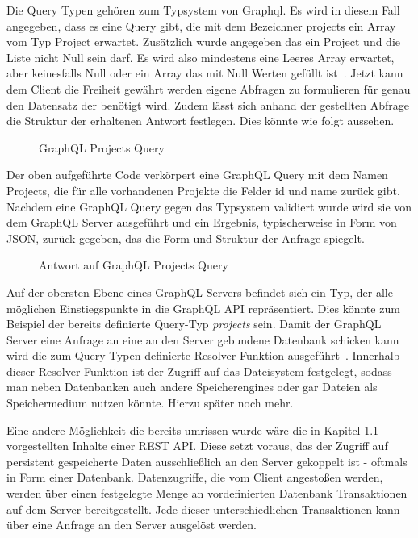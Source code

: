 Die Query Typen gehören zum Typsystem von Graphql. Es wird in diesem Fall angegeben, dass es eine Query gibt, die mit dem Bezeichner projects
ein Array vom Typ Project erwartet. Zusätzlich wurde angegeben das ein Project und die Liste nicht Null sein darf.
Es wird also mindestens eine Leeres Array erwartet, aber keinesfalls Null oder ein Array das mit Null Werten gefüllt ist~\cite{graphql}.
Jetzt kann dem Client die Freiheit gewährt werden eigene Abfragen zu formulieren für genau den Datensatz der benötigt wird.
Zudem lässt sich anhand der gestellten Abfrage die Struktur der erhaltenen Antwort festlegen. Dies könnte wie folgt aussehen.

\begin{figure}[h]
    
    \caption{GraphQL Projects Query}
    \label{fig:basics:graphql:4}
\end{figure}

Der oben aufgeführte Code verkörpert eine GraphQL Query mit dem Namen Projects, die für alle vorhandenen Projekte die Felder id und name
zurück gibt. Nachdem eine GraphQL Query gegen das Typsystem validiert wurde wird sie von dem GraphQL Server ausgeführt und
ein Ergebnis, typischerweise in Form von JSON, zurück gegeben, das die Form und Struktur der Anfrage spiegelt.

\begin{figure}[h]
    
    \caption{Antwort auf GraphQL Projects Query}
    \label{fig:basics:graphql:5}
\end{figure}

Auf der obersten Ebene eines GraphQL Servers befindet sich ein Typ, der alle möglichen Einstiegspunkte in die GraphQL API repräsentiert.
Dies könnte zum Beispiel der bereits definierte Query-Typ \emph{projects} sein.
Damit der GraphQL Server eine Anfrage an eine an den Server gebundene Datenbank schicken kann wird die zum Query-Typen definierte
Resolver Funktion ausgeführt~\cite{graphql-execution}. Innerhalb dieser Resolver Funktion ist der Zugriff auf das Dateisystem festgelegt, sodass
man neben Datenbanken auch andere Speicherengines oder gar Dateien als Speichermedium nutzen könnte.
Hierzu später noch mehr.

Eine andere Möglichkeit die bereits umrissen wurde wäre die in Kapitel 1.1 vorgestellten Inhalte einer REST API.
Diese setzt voraus, das der Zugriff auf persistent gespeicherte Daten ausschließlich an den Server gekoppelt ist - oftmals in Form einer Datenbank.
Datenzugriffe, die vom Client angestoßen werden, werden über einen festgelegte Menge an vordefinierten Datenbank Transaktionen auf dem Server bereitgestellt.
Jede dieser unterschiedlichen Transaktionen kann über eine Anfrage an den Server ausgelöst werden.


